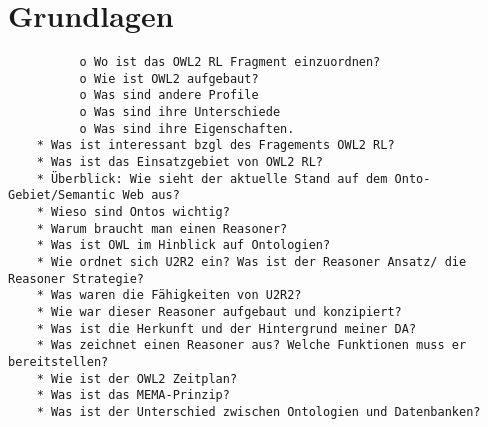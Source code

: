 \chapter{Grundlagen}

\begin{verbatim}
          o Wo ist das OWL2 RL Fragment einzuordnen?
          o Wie ist OWL2 aufgebaut?
          o Was sind andere Profile
          o Was sind ihre Unterschiede
          o Was sind ihre Eigenschaften.
    * Was ist interessant bzgl des Fragements OWL2 RL?
    * Was ist das Einsatzgebiet von OWL2 RL?
    * Überblick: Wie sieht der aktuelle Stand auf dem Onto-Gebiet/Semantic Web aus?
    * Wieso sind Ontos wichtig?
    * Warum braucht man einen Reasoner?
    * Was ist OWL im Hinblick auf Ontologien?
    * Wie ordnet sich U2R2 ein? Was ist der Reasoner Ansatz/ die Reasoner Strategie?
    * Was waren die Fähigkeiten von U2R2?
    * Wie war dieser Reasoner aufgebaut und konzipiert?
    * Was ist die Herkunft und der Hintergrund meiner DA?
    * Was zeichnet einen Reasoner aus? Welche Funktionen muss er bereitstellen?
    * Wie ist der OWL2 Zeitplan?
    * Was ist das MEMA-Prinzip?
    * Was ist der Unterschied zwischen Ontologien und Datenbanken? 
\end{verbatim}
